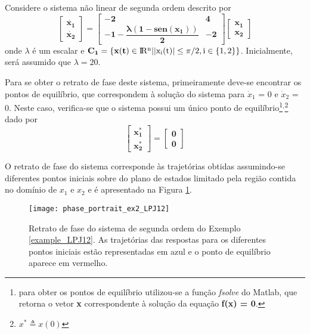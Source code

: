 \begin{example}
 Considere o sistema não linear de segunda ordem descrito por
\begin{equation*}
\mathbf{ \begin{bmatrix}\dot{x_1}\\ \dot{x_2} \end{bmatrix} = \begin{bmatrix} -2 & 4\\  -1 - \dfrac{\lambda (1 - sen(x_1))}{2} & -2 \end{bmatrix} \begin{bmatrix}x_1 \\ x_2 \end{bmatrix}}
\end{equation*}
onde $\lambda$ é um escalar e $\mathbf{C_1 = \{x(t) \in \rm I\!R^n | |x_i(t)| \leq \pi/2, i \in \{1,2\}\}}$. Inicialmente, será assumido que $\lambda = 20$.
\label{example_LPJ12}
\end{example}

Para se obter o retrato de fase deste sistema, primeiramente deve-se encontrar os pontos de equilíbrio, que correspondem à solução do sistema para $\dot{x}_1$ = 0 e $\dot{x}_2$ = 0. Neste caso, verifica-se que o sistema possui um único ponto de equilíbrio\footnote{para obter os pontos de equilíbrio utilizou-se a função \textit{fsolve} do Matlab, que retorna o vetor \textbf{x} correspondente à solução da equação \textbf{f(x) = 0}.}$^,$\footnote{$x^*\triangleq x(0)$} dado por
\begin{equation*}
\mathbf{
\begin{bmatrix}x^*_1\\x^*_2\end{bmatrix} = \begin{bmatrix}0\\0\end{bmatrix}}
\end{equation*}

O retrato de fase do sistema corresponde às trajetórias obtidas assumindo-se diferentes pontos iniciais sobre do plano de estados limitado pela região contida no domínio de ${x_1}$ e ${x_2}$ e é apresentado na Figura \ref{fig:retrato_fase_ex2_LPJ12}.

\begin{figure}[htbp]
	\centering
	\texttt{[image: phase\_portrait\_ex2\_LPJ12]}
	\caption{Retrato de fase do sistema de segunda ordem do Exemplo \ref{example_LPJ12}. As trajetórias das respostas para os diferentes pontos iniciais estão representadas em azul e o ponto de equilíbrio aparece em vermelho.}
	 \label{fig:retrato_fase_ex2_LPJ12}
\end{figure}

